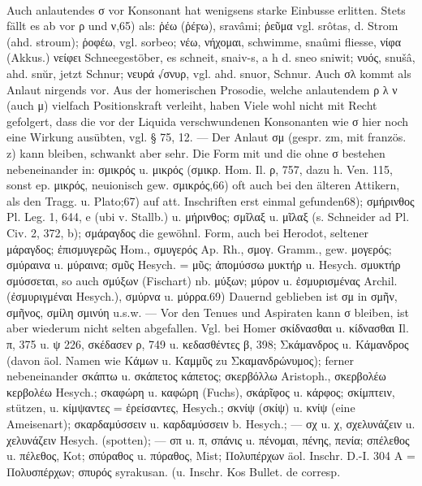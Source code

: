 \paragraph{} Auch anlautendes σ vor Konsonant hat wenigsens starke Einbusse
erlitten. Stets fällt es ab vor ρ und ν,65) als: ῥέω (ῥέϝω),  sravâmi; ῥεῦμα
vgl.  srôtas, d. Strom (ahd. stroum); ῥοφέω, vgl. sorbeo; νέω, νήχομαι,
schwimme,  snaûmi fliesse, νίφα (Akkus.) νείφει Schneegestöber, es schneit,
 snaiv-s, a h d. sneo sniwit; νυός,  snušâ, ahd. snŭr, jetzt Schnur;
νευρά √σνυρ, vgl. ahd. snuor, Schnur. Auch σλ kommt als Anlaut nirgends
vor. Aus der homerischen Prosodie, welche anlautendem ρ λ ν (auch μ) vielfach
Positionskraft verleiht, haben Viele wohl nicht mit Recht gefolgert, dass die
vor der Liquida verschwundenen Konsonanten wie σ hier noch eine Wirkung
ausübten, vgl. § 75, 12. — Der Anlaut σμ (gespr. zm, mit französ. z) kann
bleiben, schwankt aber sehr. Die Form mit und die ohne σ bestehen nebeneinander
in: σμικρός u. μικρός (σμικρ. Hom. Il. ρ, 757, dazu h. Ven. 115, sonst ep.
μικρός, neuionisch gew. σμικρός,66) oft auch bei den älteren Attikern, als den
Tragg. u. Plato;67) auf att. Inschriften erst einmal gefunden68); σμήρινθος Pl.
Leg. 1, 644, e (ubi v. Stallb.) u. μήρινθος; σμῖλαξ u. μῖλαξ (s. Schneider ad
Pl. Civ. 2, 372, b); σμάραγδος die gewöhnl. Form, auch bei Herodot, seltener
μάραγδος; ἐπισμυγερῶς Hom., σμυγερός Ap. Rh., σμογ. Gramm., gew. μογερός;
σμύραινα u. μύραινα; σμῦς Hesych. = μῦς; ἀπομύσσω μυκτήρ u. Hesych. σμυκτήρ
σμύσσεται, so auch σμύξων (Fischart) nb. μύξων; μύρον u. ἐσμυρισμένας Archil.
(ἐσμυριγμέναι Hesych.), σμύρνα u. μύρρα.69) Dauernd geblieben ist σμ in σμῆν,
σμῆνος, σμίλη σμινύη u.s.w. — Vor den Tenues und Aspiraten kann σ bleiben, ist
aber wiederum nicht selten abgefallen. Vgl. bei Homer σκίδνασθαι u. κίδνασθαι
Il. π, 375 u. ψ 226, σκέδασεν ρ, 749 u. κεδασθέντες β, 398; Σκάμανδρος u.
Κάμανδρος (davon äol. Namen wie Κάμων u. Καμμῦς zu Σκαμανδρώνυμος); ferner
nebeneinander σκάπτω u. σκάπετος κάπετος; σκερβόλλω Aristoph., σκερβολέω
κερβολέω Hesych.; σκαφώρη u. καφώρη (Fuchs), σκάρῖφος u. κάρφος; σκίμπτειν,
stützen, u. κίμψαντες = ἐρείσαντες, Hesych.; σκνίψ (σκίψ) u. κνίψ (eine
Ameisenart); σκαρδαμύσσειν u. καρδαμύσσειν b. Hesych.; — σχ u. χ, σχελυνάζειν u.
χελυνάζειν Hesych. (spotten); — σπ u. π, σπάνις u. πένομαι, πένης, πενία;
σπέλεθος u. πέλεθος, Kot; σπύραθος u. πύραθος, Mist; Πολυπέρχων äol. Inschr.
D.-I. 304 A = Πολυσπέρχων; σπυρός syrakusan. (u. Inschr. Kos Bullet. de corresp.
